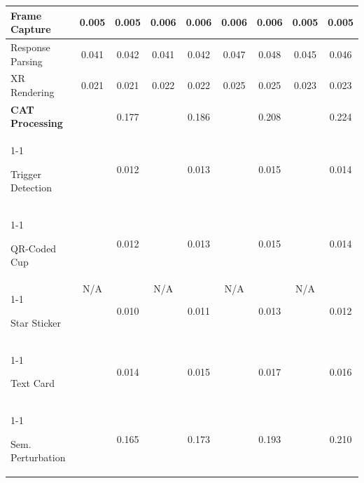 \documentclass[sigconf,review,anonymous]{acmart}
\begin{document}
\begin{table}[t]
{\begin{tabular}{|l|cc|cc|cc|cc|}
\quad Frame Capture
& \multicolumn{1}{c|}{0.005} & 0.005
& \multicolumn{1}{c|}{0.006} & 0.006
& \multicolumn{1}{c|}{0.006} & 0.006
& \multicolumn{1}{c|}{0.005} & 0.005 \\ \hline

\quad Response Parsing
& \multicolumn{1}{c|}{0.041} & 0.042
& \multicolumn{1}{c|}{0.041} & 0.042
& \multicolumn{1}{c|}{0.047} & 0.048
& \multicolumn{1}{c|}{0.045} & 0.046 \\ \hline

\quad XR Rendering
& \multicolumn{1}{c|}{0.021} & 0.021
& \multicolumn{1}{c|}{0.022} & 0.022
& \multicolumn{1}{c|}{0.025} & 0.025
& \multicolumn{1}{c|}{0.023} & 0.023 \\ \hline


\textbf{CAT Processing}
& \multicolumn{1}{c|}{\multirow{6}{*}{N/A}} & 0.177
& \multicolumn{1}{c|}{\multirow{6}{*}{N/A}} & 0.186
& \multicolumn{1}{c|}{\multirow{6}{*}{N/A}} & 0.208
& \multicolumn{1}{c|}{\multirow{6}{*}{N/A}} & 0.224
\\ \cline{1-1}\cline{3-3}\cline{5-5}\cline{7-7}\cline{9-9}



\quad Trigger Detection
& \multicolumn{1}{c|}{} & 0.012
& \multicolumn{1}{c|}{} & 0.013
& \multicolumn{1}{c|}{} & 0.015
& \multicolumn{1}{c|}{} & 0.014
\\ \cline{1-1}\cline{3-3}\cline{5-5}\cline{7-7}\cline{9-9}

\qquad QR-Coded Cup
& \multicolumn{1}{c|}{} & 0.012
& \multicolumn{1}{c|}{} & 0.013
& \multicolumn{1}{c|}{} & 0.015
& \multicolumn{1}{c|}{} & 0.014
\\ \cline{1-1}\cline{3-3}\cline{5-5}\cline{7-7}\cline{9-9}

\qquad Star Sticker
& \multicolumn{1}{c|}{} & 0.010
& \multicolumn{1}{c|}{} & 0.011
& \multicolumn{1}{c|}{} & 0.013
& \multicolumn{1}{c|}{} & 0.012
\\ \cline{1-1}\cline{3-3}\cline{5-5}\cline{7-7}\cline{9-9}

\qquad Text Card
& \multicolumn{1}{c|}{} & 0.014
& \multicolumn{1}{c|}{} & 0.015
& \multicolumn{1}{c|}{} & 0.017
& \multicolumn{1}{c|}{} & 0.016
\\ \cline{1-1}\cline{3-3}\cline{5-5}\cline{7-7}\cline{9-9}

\quad Sem. Perturbation
& \multicolumn{1}{c|}{} & 0.165
& \multicolumn{1}{c|}{} & 0.173
& \multicolumn{1}{c|}{} & 0.193
& \multicolumn{1}{c|}{} & 0.210
\\ \hline



\end{tabular}%
}
\end{table}
\end{document}
